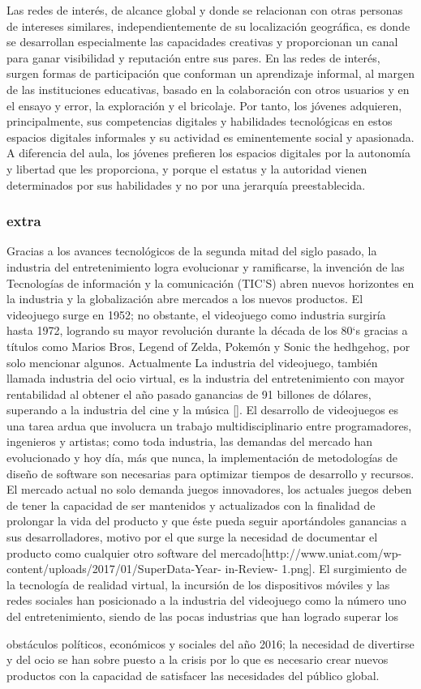   Las redes de interés, de alcance global y donde se relacionan con otras personas de intereses similares, independientemente de su localización geográfica, es donde se desarrollan especialmente las capacidades creativas y proporcionan un canal para ganar visibilidad y reputación entre sus pares. 
 En las redes de interés, surgen formas de participación que conforman un aprendizaje informal, al margen de las instituciones educativas, basado en la colaboración con otros usuarios y en el ensayo y error, la exploración y el bricolaje.
 Por tanto, los jóvenes adquieren, principalmente, sus competencias digitales y habilidades tecnológicas en estos espacios digitales informales y su actividad es eminentemente social y apasionada. A diferencia del aula, los jóvenes prefieren los espacios digitales por la autonomía y libertad que les proporciona, y porque el estatus y la autoridad vienen determinados por sus habilidades y no por una jerarquía preestablecida.
 
 \subsubsection{extra}
 Gracias a los avances tecnológicos de la segunda mitad del siglo pasado, la industria del entretenimiento logra evolucionar y
 ramificarse, la invención de las Tecnologías de información y la comunicación (TIC’S) abren nuevos horizontes en la industria y la
 globalización abre mercados a los nuevos productos. El videojuego surge en 1952; no obstante, el videojuego como industria
 surgiría hasta 1972, logrando su mayor revolución durante la década de los 80`s gracias a títulos como Marios Bros, Legend of
 Zelda, Pokemón y Sonic the hedhgehog, por solo mencionar algunos. Actualmente La industria del videojuego, también llamada
 industria del ocio virtual, es la industria del entretenimiento con mayor rentabilidad al obtener el año pasado ganancias de 91
 billones de dólares, superando a la industria del cine y la música [].
 El desarrollo de videojuegos es una tarea ardua que involucra un trabajo multidisciplinario entre programadores, ingenieros y
 artistas; como toda industria, las demandas del mercado han evolucionado y hoy día, más que nunca, la implementación de
 metodologías de diseño de software son necesarias para optimizar tiempos de desarrollo y recursos. El mercado actual no solo
 demanda juegos innovadores, los actuales juegos deben de tener la capacidad de ser mantenidos y actualizados con la finalidad de
 prolongar la vida del producto y que éste pueda seguir aportándoles ganancias a sus desarrolladores, motivo por el que surge la
 necesidad de documentar el producto como cualquier otro software del mercado[http://www.uniat.com/wp-
 content/uploads/2017/01/SuperData-Year- in-Review- 1.png].
 El surgimiento de la tecnología de realidad virtual, la incursión de los dispositivos móviles y las redes sociales han posicionado a la
 industria del videojuego como la número uno del entretenimiento, siendo de las pocas industrias que han logrado superar los
 
 obstáculos políticos, económicos y sociales del año 2016; la necesidad de divertirse y del ocio se han sobre puesto a la crisis por lo
 que es necesario crear nuevos productos con la capacidad de satisfacer las necesidades del público global.